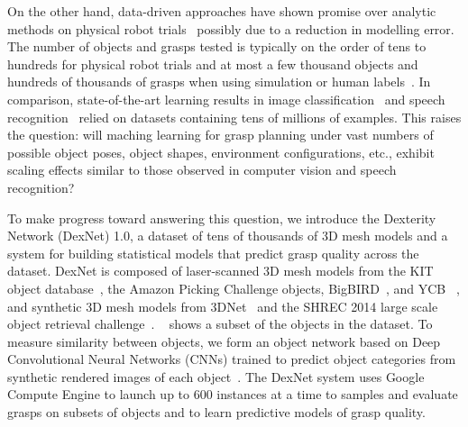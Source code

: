 On the other hand, data-driven approaches have shown promise over analytic methods on physical robot trials~\cite{balasubramanian2012physical, herzog2014learning} possibly due to a reduction in modelling error.
The number of objects and grasps tested is typically on the order of tens to hundreds for physical robot trials and at most a few thousand objects and hundreds of thousands of grasps when using simulation or human labels~\cite{goldfeder2009columbia, lenz2015deep, kappler2015leveraging}.
In comparison, state-of-the-art learning results in image classification~\cite{deng2009imagenet, krizhevsky2012imagenet} and speech recognition~\cite{cieri2004fisher, hannun2014deepspeech} relied on datasets containing tens of millions of examples.
This raises the question: will maching learning for grasp planning under vast numbers of possible object poses, object shapes, environment configurations, etc., exhibit scaling effects similar to those observed in computer vision and speech recognition?


To make progress toward answering this question, we introduce the Dexterity Network (DexNet) 1.0, a dataset of tens of thousands of 3D mesh models and a system for building statistical models that predict grasp quality across the dataset.
DexNet is composed of laser-scanned 3D mesh models from the KIT object database~\cite{kasper2012kit}, the Amazon Picking Challenge objects, BigBIRD~\cite{singh2014bigbird}, and YCB ~\cite{calli2015benchmarking}, and synthetic 3D mesh models from 3DNet~\cite{wohlkinger20123dnet} and the SHREC 2014 large scale object retrieval challenge~\cite{li2015comparison}.
~ shows a subset of the objects in the dataset.
To measure similarity between objects, we form an object network based on Deep Convolutional Neural Networks (CNNs) trained to predict object categories from synthetic rendered images of each object~\cite{aubry2015understanding, li2015comparison}.
The DexNet system uses Google Compute Engine to launch up to 600 instances at a time to samples and evaluate grasps on subsets of objects and to learn predictive models of grasp quality.


